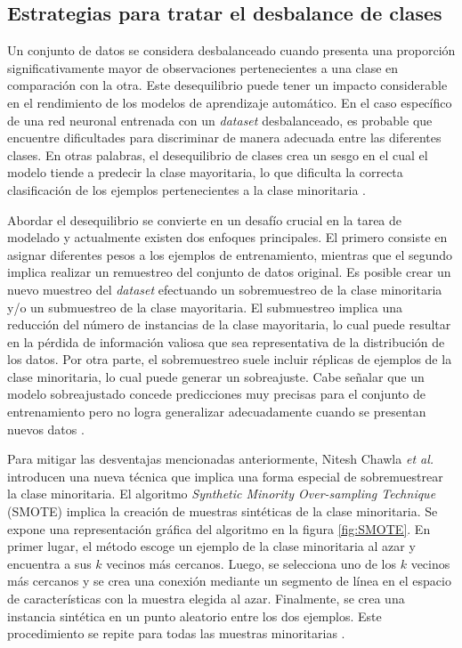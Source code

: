 \subsection{Estrategias para tratar el desbalance de clases}

Un conjunto de datos se considera desbalanceado cuando presenta una proporción significativamente mayor 
de observaciones pertenecientes a una clase en comparación con la otra. Este desequilibrio puede tener 
un impacto considerable en el rendimiento de los modelos de aprendizaje automático. En el caso específico 
de una red neuronal entrenada con un \emph{dataset} desbalanceado, es probable que encuentre dificultades 
para discriminar de manera adecuada entre las diferentes clases. En otras palabras, el desequilibrio de 
clases crea un sesgo en el cual el modelo tiende a predecir la clase mayoritaria, lo que dificulta la 
correcta clasificación de los ejemplos pertenecientes a la clase minoritaria \citep{CITE:36} \citep{CITE:37}. 

Abordar el desequilibrio se convierte en un desafío crucial en la tarea de modelado y actualmente existen 
dos enfoques principales. El primero consiste en asignar diferentes pesos a los ejemplos de entrenamiento, 
mientras que el segundo implica realizar un remuestreo del conjunto de datos original. Es posible crear 
un nuevo muestreo del \emph{dataset} efectuando un sobremuestreo de la clase minoritaria y/o un submuestreo 
de la clase mayoritaria. El submuestreo implica una reducción del número de instancias de la clase mayoritaria, 
lo cual puede resultar en la pérdida de información valiosa que sea representativa de la distribución de los 
datos. Por otra parte, el sobremuestreo suele incluir réplicas de ejemplos de la clase minoritaria, lo cual 
puede generar un sobreajuste. Cabe señalar que un modelo sobreajustado concede predicciones 
muy precisas para el conjunto de entrenamiento pero no logra generalizar adecuadamente cuando se presentan 
nuevos datos \citep{CITE:37}. 

Para mitigar las desventajas mencionadas anteriormente, Nitesh Chawla \emph{et al.} \citep{CITE:37} 
introducen una nueva técnica que implica una forma especial 
de sobremuestrear la clase minoritaria. El algoritmo 
\emph{Synthetic Minority Over-sampling Technique} (SMOTE) implica la creación de muestras sintéticas de 
la clase minoritaria. Se expone una representación gráfica del algoritmo en la figura \ref{fig:SMOTE}. 
En primer lugar, el método escoge un ejemplo de la clase minoritaria al azar y encuentra a sus $k$ vecinos 
más cercanos. Luego, se selecciona uno de los $k$ vecinos más cercanos y se crea una conexión mediante 
un segmento de línea en el espacio de características con la muestra elegida al azar. Finalmente, se crea 
una instancia sintética en un punto aleatorio entre los dos ejemplos. Este procedimiento se repite para
todas las muestras minoritarias \citep{CITE:38}. 

